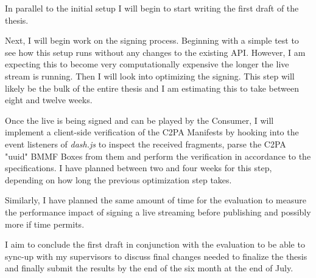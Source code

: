 \documentclass[a4paper]{article}
\begin{document}
In parallel to the initial setup I will begin to start writing the first draft of the thesis.

Next, I will begin work on the signing process. Beginning with a simple test to see how this setup runs without any changes to the existing API. However, I am expecting this to become very computationally expensive the longer the live stream is running. Then I will look into optimizing the signing. This step will likely be the bulk of the entire thesis and I am estimating this to take between eight and twelve weeks.

Once the live is being signed and can be played by the Consumer, I will implement a client-side verification of the C2PA Manifests by hooking into the event listeners of \textit{dash.js} to inspect the received fragments, parse the C2PA "uuid" BMMF Boxes from them and perform the verification in accordance to the specifications. I have planned between two and four weeks for this step, depending on how long the previous optimization step takes.

Similarly, I have planned the same amount of time for the evaluation to measure the performance impact of signing a live streaming before publishing and possibly more if time permits.

I aim to conclude the first draft in conjunction with the evaluation to be able to sync-up with my supervisors to discuss final changes needed to finalize the thesis and finally submit the results by the end of the six month at the end of July.
\end{document}
